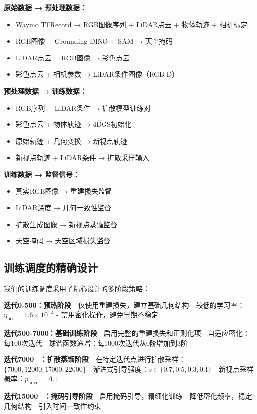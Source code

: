 \textbf{原始数据 → 预处理数据：}
\begin{itemize}
\item Waymo TFRecord → RGB图像序列 + LiDAR点云 + 物体轨迹 + 相机标定
\item RGB图像 + Grounding DINO + SAM → 天空掩码
\item LiDAR点云 + RGB图像 → 彩色点云
\item 彩色点云 + 相机参数 → LiDAR条件图像（RGB-D）
\end{itemize}

\textbf{预处理数据 → 训练数据：}
\begin{itemize}
\item RGB序列 + LiDAR条件 → 扩散模型训练对
\item 彩色点云 + 物体轨迹 → 4DGS初始化
\item 原始轨迹 + 几何变换 → 新视点轨迹
\item 新视点轨迹 + LiDAR条件 → 扩散采样输入
\end{itemize}

\textbf{训练数据 → 监督信号：}
\begin{itemize}
\item 真实RGB图像 → 重建损失监督
\item LiDAR深度 → 几何一致性监督  
\item 扩散生成图像 → 新视点蒸馏监督
\item 天空掩码 → 天空区域损失监督
\end{itemize}

\subsection{训练调度的精确设计}

我们的训练调度采用了精心设计的多阶段策略：

\textbf{迭代0-500：预热阶段}
- 仅使用重建损失，建立基础几何结构
- 较低的学习率：$\eta_{\text{pos}} = 1.6 \times 10^{-4}$
- 禁用密化操作，避免早期不稳定

\textbf{迭代500-7000：基础训练阶段}  
- 启用完整的重建损失和正则化项
- 自适应密化：每100次迭代
- 球谐函数递增：每1000次迭代从0阶增加到3阶

\textbf{迭代7000+：扩散蒸馏阶段}
- 在特定迭代点进行扩散采样：$\{7000, 12000, 17000, 22000\}$
- 渐进式引导强度：$s \in \{0.7, 0.5, 0.3, 0.1\}$
- 新视点采样概率：$p_{\text{novel}} = 0.1$

\textbf{迭代15000+：掩码引导阶段}
- 启用掩码引导，精细化训练
- 降低密化频率，稳定几何结构
- 引入时间一致性约束

